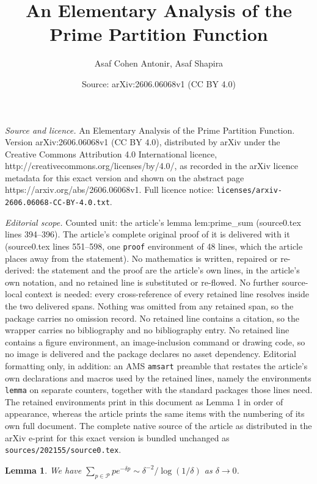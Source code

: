 \documentclass[10pt,a4paper]{amsart}
\title{An Elementary Analysis of the Prime Partition Function}
\author{Asaf Cohen Antonir, Asaf Shapira}
\date{Source: arXiv:2606.06068v1 (CC BY 4.0)}
\newtheorem{lemma}{Lemma}
\begin{document}
\maketitle

\noindent\emph{Source and licence.} An Elementary Analysis of the Prime Partition Function. Version arXiv:2606.06068v1 (CC BY 4.0), distributed by arXiv under the Creative Commons Attribution 4.0 International licence, http://creativecommons.org/licenses/by/4.0/, as recorded in the arXiv licence metadata for this exact version and shown on the abstract page https://arxiv.org/abs/2606.06068v1. Full licence notice: \texttt{licenses/arxiv-2606.06068-CC-BY-4.0.txt}.\par\smallskip

\noindent\textit{Editorial scope.} Counted unit: the article's lemma lem:prime\_sum (source0.tex lines 394--396). The article's complete original proof of it is delivered with it (source0.tex lines 551--598, one \texttt{proof} environment of 48 lines, which the article places away from the statement). No mathematics is written, repaired or re-derived: the statement and the proof are the article's own lines, in the article's own notation, and no retained line is substituted or re-flowed.  No further source-local context is needed: every cross-reference of every retained line resolves inside the two delivered spans.  Nothing was omitted from any retained span, so the package carries no omission record.  No retained line contains a citation, so the wrapper carries no bibliography and no bibliography entry.  No retained line contains a figure environment, an image-inclusion command or drawing code, so no image is delivered and the package declares no asset dependency.  Editorial formatting only, in addition: an AMS \texttt{amsart} preamble that restates the article's own declarations and macros used by the retained lines, namely the environments \texttt{lemma} on separate counters, together with the standard packages those lines need.  The retained environments print in this document as Lemma 1 in order of appearance, whereas the article prints the same items with the numbering of its own full document.  The complete native source of the article as distributed in the arXiv e-print for this exact version is bundled unchanged as \texttt{sources/202155/source0.tex}.
\begin{lemma}\label{lem:prime_sum}
We have $\sum_{p\in \mathcal{P}} p e^{-\delta p} \sim {\delta^{-2}}/{\log(1/\delta)}$ as $\delta \to 0$.
\end{lemma}
\end{document}
